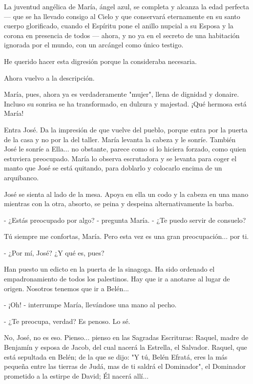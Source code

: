 \documentclass[12pt, twoside, openright]{book} %
\begin{document}
La juventud angélica de María, ángel azul, se completa y alcanza la edad perfecta — que se ha llevado consigo al Cielo y que conservará eternamente en su santo cuerpo glorificado, cuando el Espíritu pone el anillo nupcial a su Esposa y la corona en presencia de todos — ahora, y no ya en el secreto de una habitación ignorada por el mundo, con un arcángel como único testigo. 

He querido hacer esta digresión porque la consideraba necesaria. 

Ahora vuelvo a la descripción. 

María, pues, ahora ya es verdaderamente "mujer", llena de dignidad y donaire. Incluso su sonrisa se ha transformado, en dulzura y majestad. ¡Qué hermosa está María! 

Entra José. Da la impresión de que vuelve del pueblo, porque entra por la puerta de la casa y no por la del taller. María levanta la cabeza y le sonríe. También José le sonríe a Ella... no obstante, parece como si lo hiciera forzado, como quien estuviera preocupado. María lo observa escrutadora y se levanta para coger el manto que José se está quitando, para doblarlo y colocarlo encima de un arquibanco. 

José se sienta al lado de la mesa. Apoya en ella un codo y la cabeza en una mano mientras con la otra, absorto, se peina y despeina alternativamente la barba. 

- ¿Estás preocupado por algo? - pregunta María. - ¿Te puedo servir de consuelo? 

Tú siempre me confortas, María. Pero esta vez es una gran preocupación... por ti. 

- ¿Por mí, José? ¿Y qué es, pues? 

Han puesto un edicto en la puerta de la sinagoga. Ha sido ordenado el empadronamiento de todos los palestinos. Hay que ir a anotarse al lugar de origen. Nosotros tenemos que ir a Belén... 

- ¡Oh! - interrumpe María, llevándose una mano al pecho. 

- ¿Te preocupa, verdad? Es penoso. Lo sé. 

No, José, no es eso. Pienso... pienso en las Sagradas Escrituras: Raquel, madre de Benjamín y esposa de Jacob, del cual nacerá la Estrella, el Salvador. Raquel, que está sepultada en Belén; de la que se dijo: "Y tú, Belén Efratá, eres la más pequeña entre las tierras de Judá, mas de ti saldrá el Dominador", el Dominador prometido a la estirpe de David; Él nacerá allí... 
\end{document}
